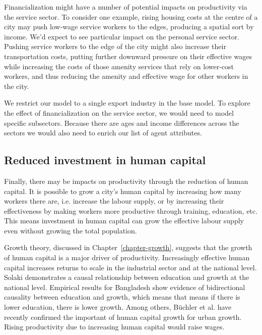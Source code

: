 Financialization might have a number of potential impacts on productivity via the service sector. To consider one example, rising housing costs at the centre of a city may push low-wage service workers to the edges, producing a spatial sort by income. We'd expect to see particular impact on the personal service sector. Pushing service workers to the edge of the city might also increase their transportation costs, putting further downward pressure on their effective wages while increasing the costs of those amenity services that rely on lower-cost workers, and thus reducing the amenity and effective wage for other workers in the city. 

We restrict our model to a single export industry in the base model. 
To explore the effect of financialization on the service sector, %
we would need to  model specific subsectors. Because there are ages and income differences across the sectors we would also need to enrich our list of agent attributes. 


\subsection{Reduced investment in human capital}
Finally, there may be impacts on productivity through the reduction of human capital. 
It is possible to grow a city's \gls{human capital} by increasing how many workers there are, i.e. increase the labour supply, or by increasing their effectiveness by making workers more productive through training, education, etc. %
This means investment in human capital can grow the \gls{effective labour supply} even without growing the total population.

Growth theory, discussed in Chapter~\ref{chapter-growth}, suggests that the growth of human capital is a major driver of productivity. Increasingly effective human capital increases returns to scale in the industrial sector and at the national level. 
Solaki \cite{solakiRelationshipEducationGDP2013} demonstrates a causal relationship between education and growth at the national level. Empirical results for Bangladesh \cite{islam2007relationship} show evidence of bidirectional causality between education and growth, which means that means if there is lower education, there is lower growth.  Among others, B\"uchler et al. \cite{buchlerImpactHumanCapital2024} have recently confirmed the important of human capital growth for urban growth.
Rising productivity due to increasing human capital would raise wages. %

